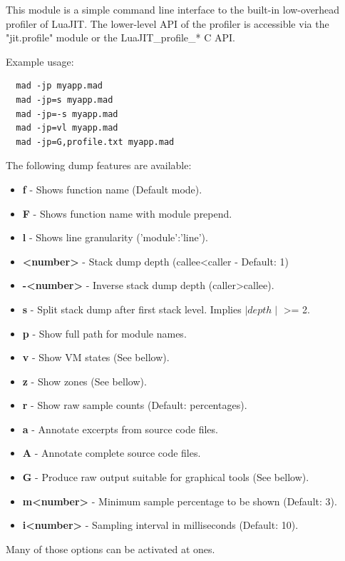 
This module is a simple command line interface to the built-in
low-overhead profiler of LuaJIT. The lower-level API of the profiler
is accessible via the "jit.profile" module or the LuaJIT\_profile\_* C API.

Example usage:
\begin{lstlisting}
  mad -jp myapp.mad
  mad -jp=s myapp.mad
  mad -jp=-s myapp.mad
  mad -jp=vl myapp.mad
  mad -jp=G,profile.txt myapp.mad
\end{lstlisting}
The following dump features are available:
 \begin{itemize}%
  \item \textbf{f} - Shows function name (Default mode).
  \item \textbf{F} - Shows function name with module prepend.
  \item \textbf{l} - Shows line granularity ('module':'line').
  \item \textbf{\textless number\textgreater} - Stack dump depth (callee\textless caller - Default: 1)
  \item \textbf{-\textless number\textgreater} - Inverse stack dump depth (caller\textgreater callee).
  \item \textbf{s} - Split stack dump after first stack level. Implies $\mid depth\mid$
  \textgreater= 2.
  \item \textbf{p} - Show full path for module names.
  \item \textbf{v} - Show VM states (See bellow).
  \item \textbf{z} - Show zones (See bellow).
  \item \textbf{r} - Show raw sample counts (Default: percentages).
  \item \textbf{a} - Annotate excerpts from source code files.
  \item \textbf{A} - Annotate complete source code files.
  \item \textbf{G} - Produce raw output suitable for graphical tools (See bellow).
  \item \textbf{m\textless number\textgreater} - Minimum sample percentage to be shown (Default: 3).
  \item \textbf{i\textless number\textgreater} - Sampling interval in milliseconds (Default: 10).
 \end{itemize}

 Many of those options can be activated at ones.\\

